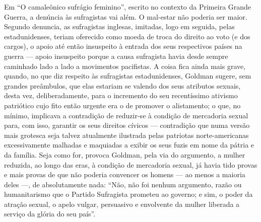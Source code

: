 Em ``O camaleônico sufrágio feminino'', escrito no contexto da Primeira
Grande Guerra, a denúncia às sufragistas vai além. O mal-estar não
poderia ser maior. Segundo denuncia, as sufragistas inglesas, imitadas,
logo em seguida, pelas estadunidenses, teriam oferecido como moeda de
troca do direito ao voto (e dos cargos), o apoio até então insuspeito à
entrada dos seus respectivos países na guerra --- apoio insuspeito porque
a causa sufragista havia desde sempre caminhado lado a lado a movimentos
pacifistas. A coisa fica ainda mais grave, quando, no que diz respeito
às sufragistas estadunidenses, Goldman sugere, sem grandes preâmbulos,
que elas estariam se valendo dos seus atributos sexuais, desta vez,
deliberadamente, para o incremento do seu recentíssimo ativismo
patriótico cujo fito então urgente era o de promover o alistamento; o
que, no mínimo, implicava a contradição de reduzir-se à condição de
mercadoria sexual para, com isso, garantir os seus direitos cívicos ---
contradição que numa versão mais grotesca seja talvez atualmente
ilustrada pelas patriotas norte-americanas excessivamente malhadas e
maquiadas a exibir os seus fuzis em nome da pátria e da família. Seja
como for, provoca Goldman, pela via do argumento, a mulher reduzida, ao
longo das eras, à condição de mercadoria sexual, já havia tido provas e
mais provas de que não poderia convencer os homens --- ao menos a maioria
deles ---, de absolutamente nada: ``Não, não foi nenhum argumento, razão
ou humanitarismo que o Partido Sufragista prometeu ao governo; e sim, o
poder da atração sexual, o apelo vulgar, persuasivo e envolvente da
mulher liberada a serviço da glória do seu país''.

